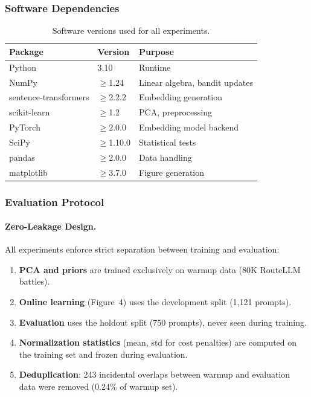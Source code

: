 \subsubsection{Software Dependencies}

\begin{table}[h]
\centering
\caption{Software versions used for all experiments.}
\label{tab:software}
\small
\begin{tabular}{@{}lll@{}}
\toprule
\textbf{Package} & \textbf{Version} & \textbf{Purpose} \\
\midrule
Python & 3.10 & Runtime \\
NumPy & $\geq$1.24 & Linear algebra, bandit updates \\
sentence-transformers & $\geq$2.2.2 & Embedding generation \\
scikit-learn & $\geq$1.2 & PCA, preprocessing \\
PyTorch & $\geq$2.0.0 & Embedding model backend \\
SciPy & $\geq$1.10.0 & Statistical tests \\
pandas & $\geq$2.0.0 & Data handling \\
matplotlib & $\geq$3.7.0 & Figure generation \\
\bottomrule
\end{tabular}
\end{table}

\subsubsection{Evaluation Protocol}

\paragraph{Zero-Leakage Design.}
All experiments enforce strict separation between training and evaluation:
\begin{enumerate}[leftmargin=*,noitemsep]
    \item \textbf{PCA and priors} are trained exclusively on warmup data (80K RouteLLM battles).
    \item \textbf{Online learning} (Figure~4) uses the development split (1,121 prompts).
    \item \textbf{Evaluation} uses the holdout split (750 prompts), never seen during training.
    \item \textbf{Normalization statistics} (mean, std for cost penalties) are computed on the training set and frozen during evaluation.
    \item \textbf{Deduplication}: 243 incidental overlaps between warmup and evaluation data were removed (0.24\% of warmup set).
\end{enumerate}


